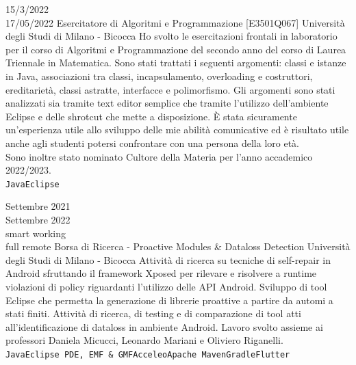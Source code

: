 \documentclass[9pt]{developercv} %
\begin{document}
\begin{entrylist}
\entry
	{15/3/2022 \\ 17/05/2022}
	{Esercitatore di Algoritmi e Programmazione [E3501Q067]}
	{Università degli Studi di Milano - Bicocca}
	{Ho svolto le esercitazioni frontali in laboratorio per il corso di Algoritmi e Programmazione del secondo anno del corso di Laurea Triennale in Matematica. Sono stati trattati i seguenti argomenti: classi e istanze in Java, associazioni tra classi, incapsulamento, overloading e costruttori, ereditarietà, classi astratte, interfacce e polimorfismo. Gli argomenti sono stati analizzati sia tramite text editor semplice che tramite l'utilizzo dell'ambiente Eclipse e delle shrotcut che mette a disposizione. È stata sicuramente un'esperienza utile allo sviluppo delle mie abilità comunicative ed è risultato utile anche agli studenti potersi confrontare con una persona della loro età.\\
Sono inoltre stato nominato Cultore della Materia per l'anno accademico 2022/2023.\\ \texttt{Java}\slashsep\texttt{Eclipse}}

\entry
	{Settembre 2021 \\ Settembre 2022	\\\footnotesize{smart working}\\\footnotesize{full remote}}
	{Borsa di Ricerca - Proactive Modules \& Dataloss Detection}
	{Università degli Studi di Milano - Bicocca}
	{Attività di ricerca su tecniche di self-repair in Android sfruttando il framework Xposed per rilevare e risolvere a runtime violazioni di policy riguardanti l'utilizzo delle API Android. Sviluppo di tool Eclipse che permetta la generazione di librerie proattive a partire da automi a stati finiti. Attività di ricerca, di testing e di comparazione di tool atti all'identificazione di dataloss in ambiente Android. Lavoro svolto assieme ai professori Daniela Micucci, Leonardo Mariani e Oliviero Riganelli. \\ \texttt{Java}\slashsep\texttt{Eclipse PDE, EMF \& GMF}\slashsep\texttt{Acceleo}\slashsep\texttt{Apache Maven}\slashsep\texttt{Gradle}\slashsep\texttt{Flutter}}
	

\end{entrylist}
\end{document}
